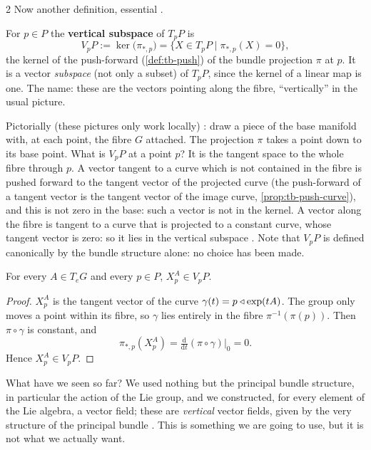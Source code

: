 \begin{paracol}{2}
Now another definition, essential .
\begin{definition}\label{def:cn-vertical}
For $p\in P$ the \textbf{vertical subspace} of $T_pP$ is
\[
  V_pP:=\ker\bigl(\pi_{*,p}\bigr)=\{X\in T_pP\mid\pi_{*,p}(X)=0\},
\]
the kernel of the push-forward (\cref{def:tb-push}) of the bundle projection $\pi$ at $p$. It is a vector \emph{subspace} (not only a subset) of $T_pP$, since the kernel of a linear map is one. The name: these are the vectors pointing along the fibre, ``vertically'' in the usual picture.   
\end{definition}
Pictorially (these pictures only work locally)  : draw a piece of the base manifold with, at each point, the fibre $G$ attached. The projection $\pi$ takes a point down to its base point. What is $V_pP$ at a point $p$? It is the tangent space to the whole fibre through $p$. A vector tangent to a curve which is not contained in the fibre is pushed forward to the tangent vector of the projected curve (the push-forward of a tangent vector is the tangent vector of the image curve, \cref{prop:tb-push-curve}), and this is not zero in the base: such a vector is not in the kernel. A vector along the fibre is tangent to a curve that is projected to a constant curve, whose tangent vector is zero: so it lies in the vertical subspace       . Note that $V_pP$ is defined canonically by the bundle structure alone: no choice has been made.
\begin{lemma}[$X^A$ is vertical]\label{lem:cn-vertical}
For every $A\in T_eG$ and every $p\in P$, $X^A_p\in V_pP$.  
\end{lemma}
\begin{proof}
$X^A_p$ is the tangent vector of the curve $\gamma(t)=p\mathbin{\triangleleft}\exp(tA)$. The group only moves a point within its fibre, so $\gamma$ lies entirely in the fibre $\pi^{-1}(\pi(p))$. Then $\pi\circ\gamma$ is constant, and
\[
  \pi_{*,p}(X^A_p)=\tfrac{\mathrm d}{\mathrm dt}(\pi\circ\gamma)\big|_0=0 .
\]
Hence $X^A_p\in V_pP$.   
\end{proof}
What have we seen so far? We used nothing but the principal bundle structure, in particular the action of the Lie group, and we constructed, for every element of the Lie algebra, a vector field; these are \emph{vertical} vector fields, given by the very structure of the principal bundle  . This is something we are going to use, but it is not what we actually want.

\end{paracol}
